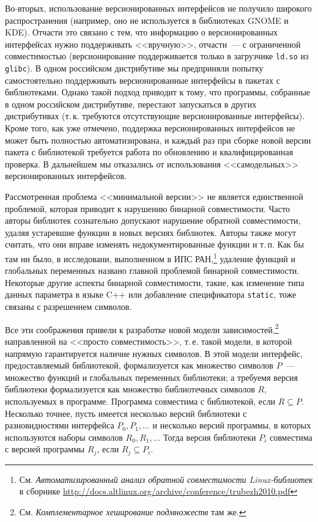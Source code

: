 \documentclass[russian,a4paper,12pt,titlepage]{article}
\begin{document}
Во-вторых, использование версионированных интерфейсов не получило широкого распространения (например, оно не используется
в библиотеках GNOME и KDE).  Отчасти это связано с тем, что информацию о версионированных интерфейсах нужно поддерживать <<вручную>>,
отчасти~--- с ограниченной совместимостью (версионирование поддерживается только в загрузчике \verb|ld.so| из \verb|glibc|).
В одном российском дистрибутиве мы предприняли попытку самостоятельно поддерживать версионированные интерфейсы в пакетах
с библиотеками.  Однако такой подход приводит к тому, что программы, собранные в одном российском дистрибутиве, перестают
запускаться в других дистрибутивах (т.\,к. требуются отсутствующие версионированные интерфейсы).  Кроме того, как уже отмечено,
поддержка версионированных интерфейсов не может быть полностью автоматизирована, и каждый раз при сборке новой версии пакета
с библиотекой требуется работа по обновлению и квалифицированная проверка.
В дальнейшем мы отказались от использования <<самодельных>> версионированных интерфейсов.

Рассмотренная проблема <<минимальной версии>> не является единственной проблемой, которая приводит к нарушению бинарной совместимости.
Часто авторы библиотек сознательно допускают нарушение обратной совместимости, удаляя устаревшие функции в новых версиях библиотек.
Авторы также могут считать, что они вправе изменять недокументированные функции и т.\,п.  Как бы там ни было, в исследовани,
выполненном в ИПС РАН,\footnote{См. \emph{Автоматизированный анализ обратной совместимости Linux-библиотек} в сборнике
\url{http://docs.altlinux.org/archive/conference/trubezh2010.pdf}} удаление функций и глобальных переменных названо
главной проблемой бинарной совместимости.  Некоторые другие аспекты бинарной совместимости, такие, как изменение типа данных
параметра в языке C++ или добавление спецификатора \verb|static|, тоже связаны с разрешением символов.

Все эти соображения привели к разработке новой модели зависимостей,\footnote{См. \textit{Комплементарное хеширование подмножеств} там же.}
направленной на <<просто совместимость>>, т.\,е. такой модели, в которой напрямую гарантируется наличие нужных символов.  В этой модели
интерфейс, предоставляемый библиотекой, формализуется как множество символов $P$~--- множество функций и глобальных переменных библиотеки;
а требуемя версия библиотеки формализуется как множество библиотечных символов $R$, используемых в программе.  Программа совместима
с библиотекой, если $R\subseteq P$.  Несколько точнее, пусть имеется несколько версий библиотеки с разновидностями интерфейса
$P_0,P_1,\ldots$ и несколько версий программы, в которых используются наборы символов $R_0,R_1,\ldots$  Тогда версия библиотеки $P_i$
совместима с версией программы $R_j$, если $R_j\subseteq P_i$.
\end{document}
